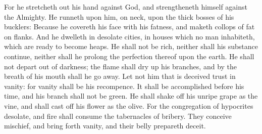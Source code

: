 {For he stretcheth
out his
hand against
God, and
strengtheneth himself against the
Almighty.
He
runneth upon him,
{} on
{}
neck, upon the
thick
bosses of his
bucklers:
Because he
covereth his
face with his
fatness, and
maketh collops of
fat on
{}
flanks.
And he
dwelleth in
desolate
cities,
{} in
houses which no man
inhabiteth, which are
ready to become
heaps.
He shall not be
rich, neither shall his
substance
continue, neither shall he
prolong the
perfection thereof upon the
earth.
He shall not
depart out of
darkness; the
flame shall dry
up his
branches, and by the
breath of his
mouth shall he go
away.
Let not him that is
deceived
trust in
vanity: for
vanity shall be his
recompence.
It shall be
accomplished
before his
time, and his
branch shall not be
green.
He shall shake
off his unripe
grape as the
vine, and shall cast
off his
flower as the
olive.
For the
congregation of
hypocrites
{}
desolate, and
fire shall
consume the
tabernacles of
bribery.
They
conceive
mischief, and bring
forth
vanity, and their
belly
prepareth
deceit.

}
